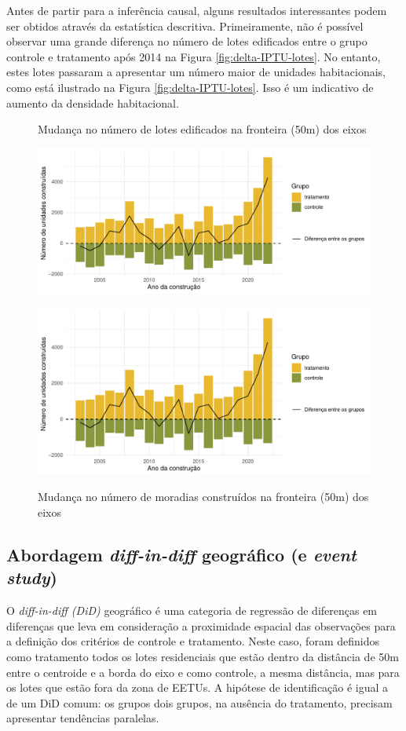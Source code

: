 Antes de partir para a inferência causal, alguns resultados interessantes podem ser obtidos através da estatística descritiva. Primeiramente, não é possível observar uma grande diferença no número de lotes edificados entre o grupo controle e tratamento após 2014 na Figura \ref{fig:delta-IPTU-lotes}. No entanto, estes lotes passaram a apresentar um número maior de unidades habitacionais, como está ilustrado na Figura \ref{fig:delta-IPTU-lotes}. Isso é um indicativo de aumento da densidade habitacional.  

\begin{figure}[h]
    \centering
    \caption{Mudança no número de lotes edificados  na fronteira (50m) dos eixos}
    \includegraphics[width = .8\textwidth]{figuras/IPTU-delta-lotes.pdf}
    \label{fig:delta-IPTU-lotes}

    \caption{Mudança no número de moradias construídos na fronteira (50m) dos eixos}
    \includegraphics[width = .8\textwidth]{figuras/IPTU-delta-unidades.pdf}
    \label{fig:delta-IPTU-unidades}
\end{figure}

\subsection{Abordagem \textit{diff-in-diff} geográfico (e \textit{event study})}

O \textit{diff-in-diff (DiD)} geográfico é uma categoria de regressão de diferenças em diferenças que leva em consideração a proximidade espacial das observações para a definição dos critérios de controle e tratamento. Neste caso, foram definidos como tratamento todos os lotes residenciais que estão dentro da distância de 50m entre o centroide e a borda do eixo e como controle, a mesma distância, mas para os lotes que estão fora da zona de EETUs. A hipótese de identificação é igual a de um DiD comum: os grupos dois grupos, na ausência do tratamento, precisam apresentar tendências paralelas. 


